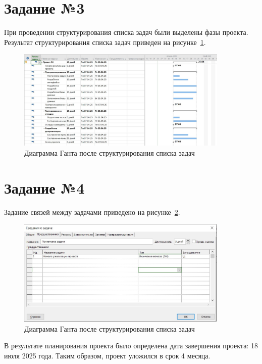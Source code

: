 \section{Задание №3}

При проведении структурирования списка задач были выделены фазы проекта.
Результат структурирования списка задач приведен на рисунке~\ref{fig:task3}.

\begin{figure}[H]
	\centering
	\includegraphics[width=0.9\textwidth]{img/task3/task3.jpg}
	\caption{Диаграмма Ганта после структурирования списка задач}
	\label{fig:task3}
\end{figure}

\section{Задание №4}

Задание связей между задачами приведено на рисунке~\ref{fig:task4_1}.

\begin{figure}[H]
	\centering
	\includegraphics[width=0.9\textwidth]{img/task4/screen4_1.jpg}
	\caption{Диаграмма Ганта после структурирования списка задач}
	\label{fig:task4_1}
\end{figure}

В результате планирования проекта было определена дата завершения проекта: 18 июля 2025 года.
Таким образом, проект уложился в срок 4 месяца.

